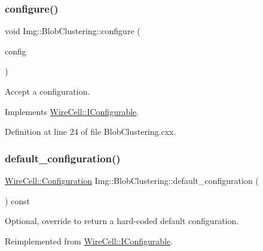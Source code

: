 \subsubsection{\texorpdfstring{configure()}{configure()}}
{\footnotesize\ttfamily void Img\+::\+Blob\+Clustering\+::configure (\begin{DoxyParamCaption}\item[{const \hyperlink{namespace_wire_cell_a9f705541fc1d46c608b3d32c182333ee}{Wire\+Cell\+::\+Configuration} \&}]{config }\end{DoxyParamCaption})\hspace{0.3cm}{\ttfamily [virtual]}}



Accept a configuration. 



Implements \hyperlink{class_wire_cell_1_1_i_configurable_a57ff687923a724093df3de59c6ff237d}{Wire\+Cell\+::\+I\+Configurable}.



Definition at line 24 of file Blob\+Clustering.\+cxx.

\mbox{\label{class_wire_cell_1_1_img_1_1_blob_clustering_a9833b4248ce1a3b6564d42b6d256877b}} 
\subsubsection{\texorpdfstring{default\+\_\+configuration()}{default\_configuration()}}
{\footnotesize\ttfamily \hyperlink{namespace_wire_cell_a9f705541fc1d46c608b3d32c182333ee}{Wire\+Cell\+::\+Configuration} Img\+::\+Blob\+Clustering\+::default\+\_\+configuration (\begin{DoxyParamCaption}{ }\end{DoxyParamCaption}) const\hspace{0.3cm}{\ttfamily [virtual]}}



Optional, override to return a hard-\/coded default configuration. 



Reimplemented from \hyperlink{class_wire_cell_1_1_i_configurable_a54841b2da3d1ea02189478bff96f7998}{Wire\+Cell\+::\+I\+Configurable}.




